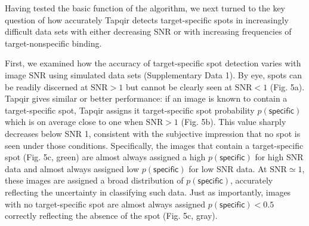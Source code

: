 Having tested the basic function of the algorithm, we next turned to the key question of how accurately Tapqir detects target-specific spots in increasingly difficult data sets with either decreasing SNR or with increasing frequencies of target-nonspecific binding.  

First, we examined how the accuracy of target-specific spot detection varies with  image SNR using simulated data sets (Supplementary Data 1). By eye, spots can be readily discerned at $\mathrm{SNR}>1$ but cannot be clearly seen at $\mathrm{SNR}<1$ (Fig. 5a). Tapqir gives similar or better performance:  if an image is known to contain a target-specific spot, Tapqir assigns it target-specific spot probability $p(\mathsf{specific})$ which is on average close to  one when $\mathrm{SNR}>1$ (Fig. 5b).  This value sharply decreases below SNR 1, consistent with the subjective impression that no spot is seen under those conditions.  Specifically, the images that contain a target-specific spot (Fig. 5c, green) are almost always assigned a high $p(\mathsf{specific})$ for high SNR data and almost always assigned low $p(\mathsf{specific})$ for low SNR data.  At $\mathrm{SNR} \simeq 1$, these images are assigned a broad distribution of $p(\mathsf{specific})$, accurately reflecting the uncertainty in classifying such data.  Just as importantly, images with no target-specific spot are almost always assigned $p(\mathsf{specific}) < 0.5$ correctly reflecting the absence of the spot (Fig. 5c, gray).



